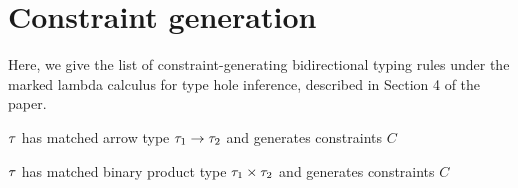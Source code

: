 \documentclass[formalism.tex]{subfiles}
\begin{document}





\section{Constraint generation}
\label{sec:constraint}
Here, we give the list of constraint-generating bidirectional typing rules under the marked lambda
calculus for type hole inference, described in Section 4 of the paper.

 $\TMV$ has matched arrow type $\TArrow{\TMV_1}{\TMV_2}$ and generates constraints $C$
\begin{mathpar}

\end{mathpar}

 $\TMV$ has matched binary product type $\TProd{\TMV_1}{\TMV_2}$ and generates constraints $C$
\begin{mathpar}

\end{mathpar}
\end{document}
